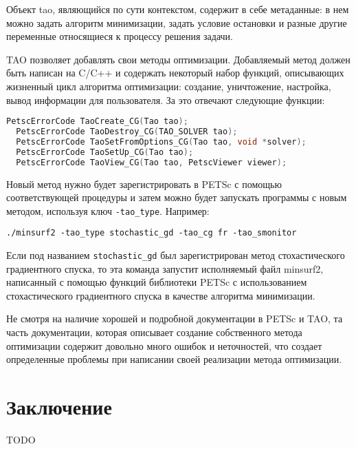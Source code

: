 \documentclass[12pt]{report}
\begin{document}
  Объект tao, являющийся по сути контекстом, содержит в себе метаданные: в нем
  можно задать алгоритм минимизации, задать условие остановки и разные другие
  переменные относящиеся к процессу решения задачи.

  TAO позволяет добавлять свои методы оптимизации. Добавляемый метод должен быть
  написан на C/C++ и содержать некоторый набор функций, описывающих жизненный цикл
  алгоритма оптимизации: создание, уничтожение, настройка, вывод информации для
  пользователя. За это отвечают следующие функции:
  \begin{lstlisting}[language=C, frame=single]
  PetscErrorCode TaoCreate_CG(Tao tao);
  PetscErrorCode TaoDestroy_CG(TAO_SOLVER tao);
  PetscErrorCode TaoSetFromOptions_CG(Tao tao, void *solver);
  PetscErrorCode TaoSetUp_CG(Tao tao);
  PetscErrorCode TaoView_CG(Tao tao, PetscViewer viewer);
  \end{lstlisting}

  Новый метод нужно будет зарегистрировать в PETSc с помощью соответствующей
  процедуры и затем можно будет запускать программы с новым методом, используя
  ключ \verb|-tao_type|. Например:

  \verb|./minsurf2 -tao_type stochastic_gd -tao_cg fr -tao_smonitor|

  Если под названием \verb|stochastic_gd| был зарегистрирован метод стохастического
  градиентного спуска, то эта команда запустит исполняемый файл minsurf2,
  написанный с помощью функций библиотеки PETSc с использованием стохастического
  градиентного спуска в качестве алгоритма минимизации.

  Не смотря на наличие хорошей и подробной документации в PETSc и TAO, та часть
  документации, которая описывает создание собственного метода оптимизации содержит
  довольно много ошибок и неточностей, что создает определенные проблемы при
  написании своей реализации метода оптимизации.

  \chapter{Заключение}
  {TODO}
\end{document}
